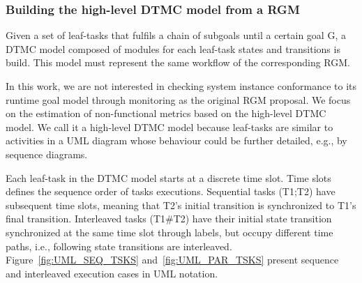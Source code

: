\subsubsection{Building the high-level DTMC model from a RGM}


Given a set of leaf-tasks that fulfils a chain of subgoals until a certain goal G, a DTMC model composed of modules for each leaf-task states and transitions is build. This model must represent the same workflow of the corresponding RGM.  

In this work, we are not interested in checking system instance conformance to its runtime goal model through monitoring as the original RGM proposal. We focus on the estimation of non-functional metrics based on the high-level DTMC model. We call it a high-level DTMC model because leaf-tasks are similar to activities in a UML diagram whose behaviour could be further detailed, e.g., by sequence diagrams.

Each leaf-task in the DTMC model starts at a discrete time slot. Time slots defines the sequence order of tasks executions. Sequential tasks (T1;T2) have subsequent time slots, meaning that T2's initial transition is synchronized to T1's final transition. Interleaved tasks (T1\#T2) have their initial state transition synchronized at the same time slot through labels, but occupy different time paths, i.e., following state transitions are interleaved.  Figure~\ref{fig:UML_SEQ_TSKS} and~\ref{fig:UML_PAR_TSKS} present sequence and interleaved execution cases in UML notation.

